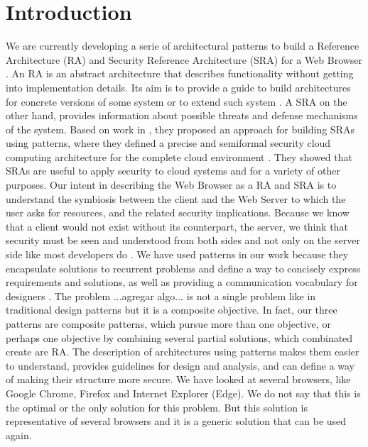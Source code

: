\documentclass[prodmode,hillsideplop]{acmlarge}
\begin{document}
\section{Introduction}
We are currently developing a serie of architectural patterns to build a Reference Architecture (RA) and Security Reference Architecture (SRA) for a Web Browser \cite{silva2015,silva2015b,silva2016a}.
An RA is an abstract architecture that describes functionality without getting into implementation details. Its aim is to provide a guide to build architectures for concrete versions of some system or to extend such system \cite{Avgeriou2003,Galster2011a,Angelov2012}.
A SRA on the other hand, provides information about possible threats and defense mechanisms of the system. Based on work in \cite{Fernandez2006}, they proposed an approach for building SRAs using patterns, where they defined a precise and semiformal security cloud computing architecture for the complete cloud environment \cite{Fernandez2016}. They showed that SRAs are useful to apply security to cloud systems and for a variety of other purposes. Our intent in describing the Web Browser as a RA and SRA is to understand the symbiosis between the client and the Web Server to which the user asks for resources, and the related security implications. Because we know that a client would not exist without its counterpart, the server, we think that security must be seen and understood from both sides and not only on the server side like most developers do \cite{alcorn2014browser}.
We have used patterns in our work because they encapsulate solutions to recurrent problems and define a way to concisely express requirements and solutions, as well as providing a communication vocabulary for designers \cite{gamma1994design,buschman1996system}. The problem ...agregar algo... is not a single problem like in traditional design patterns but it is a composite objective. In fact, our three patterns are composite patterns, which pursue more than one objective, or perhaps one objective by combining several partial solutions, which combinated create are RA. The description of architectures using patterns makes them easier to understand, provides guidelines for design and analysis, and can define a way of making their structure more secure. We have looked at several browsers, like Google Chrome, Firefox and Internet Explorer (Edge). We do not say that this is the optimal or the only solution for this problem. But this solution is representative of several browsers and it is a generic solution that can be used again.
 
\end{document}
